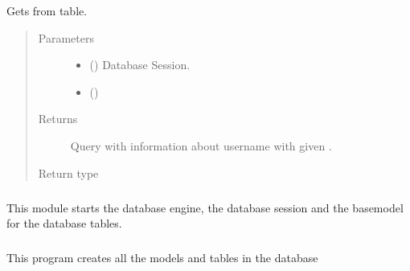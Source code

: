 \documentclass[a4paper,landscape,10pt,english]{sphinxmanual}
\begin{document}
\begin{fulllineitems}
\label{\detokenize{code_docs/simulation_API.model:simulation_API.model.crud._get_username}}
Gets  from  table.
\begin{quote}\begin{description}
\item[{Parameters}] \leavevmode\begin{itemize}
\item {} 
 () \textendash{} Database Session.

\item {} 
 () \textendash{} 

\end{itemize}

\item[{Returns}] \leavevmode
Query with information about username with given .

\item[{Return type}] \leavevmode
{}

\end{description}\end{quote}

\end{fulllineitems}



\subparagraph{}
\label{\detokenize{code_docs/simulation_API.model:module-simulation_API.model.db_manager}}\label{\detokenize{code_docs/simulation_API.model:simulation-api-model-db-manager}}
This module starts the database engine, the database session and the
basemodel for the database tables.


\subparagraph{}
\label{\detokenize{code_docs/simulation_API.model:module-simulation_API.model.models}}\label{\detokenize{code_docs/simulation_API.model:simulation-api-model-models}}
This program creates all the models and tables in the database
\end{document}
